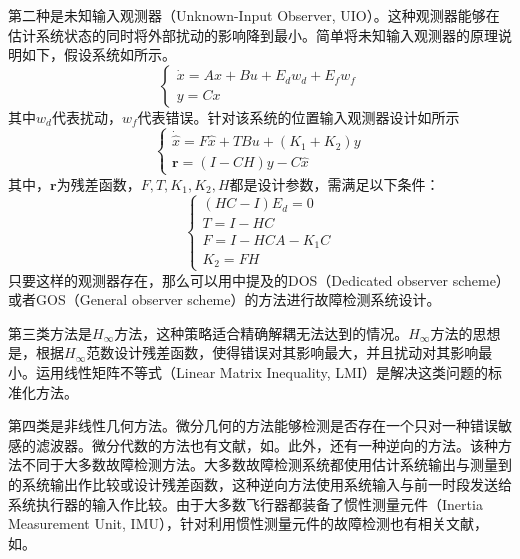 第二种是未知输入观测器（Unknown-Input Observer, UIO）。这种观测器能够在估计系统状态的同时将外部扰动的影响降到最小\cite{jie1996design,1657536,220921}。简单将未知输入观测器的原理说明如下，假设系统如所示。
\begin{equation}\label{eq:UIO1}
\begin{cases}
\dot{x} = Ax+Bu+E_dw_d+E_fw_f \\
y = Cx 
\end{cases}
\end{equation}
其中$w_d$代表扰动，$w_f$代表错误。针对该系统的位置输入观测器设计如所示
\begin{equation}\label{eq:UIO2}
\begin{cases}
\dot{\hat{x}}=F\hat{x}+TBu+(K_1+K_2)y \\
\mathbf{r} = (I-CH)y-C\hat{x}
\end{cases}
\end{equation}
其中，$\mathbf{r}$为残差函数，$F,T,K_1,K_2,H$都是设计参数，需满足以下条件：
\begin{equation*}
\begin{cases}
(HC-I)E_d=0\\
T = I - HC\\
F= I-HCA-K_1C\\
K_2=FH
\end{cases}
\end{equation*}
只要这样的观测器存在，那么可以用中提及的DOS（Dedicated observer scheme）或者GOS（General observer scheme）的方法进行故障检测系统设计。

第三类方法是$H_{\infty}$方法，这种策略适合精确解耦无法达到的情况\cite{doi:10.1080/002071799220704,Henry2005251}。$H_{\infty}$方法的思想是，根据$H_{\infty}$范数设计残差函数，使得错误对其影响最大，并且扰动对其影响最小。运用线性矩阵不等式（Linear Matrix Inequality, LMI）是解决这类问题的标准化方法\cite{Zhong2003543}。

第四类是非线性几何方法。微分几何的方法\cite{928586,Bokor2009113}能够检测是否存在一个只对一种错误敏感的滤波器\cite{Marzat2012modelbased}。微分代数的方法也有文献，如。此外，还有一种逆向的方法\cite{edelmayer2004input,doi:10.1080/00207170802582215,1102181}。该种方法不同于大多数故障检测方法。大多数故障检测系统都使用估计系统输出与测量到的系统输出作比较或设计残差函数，这种逆向方法使用系统输入与前一时段发送给系统执行器的输入作比较。由于大多数飞行器都装备了惯性测量元件（Inertia Measurement Unit, IMU），针对利用惯性测量元件的故障检测也有相关文献，如。

